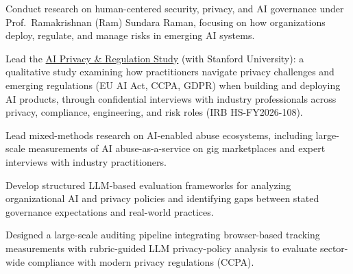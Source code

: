 \documentclass[letterpaper,10pt]{article}
\begin{document}
\begin{bullets}
  \item Conduct research on human-centered security, privacy, and AI governance under Prof.\ Ramakrishnan (Ram) Sundara Raman, focusing on how organizations deploy, regulate, and manage risks in emerging AI systems.
  \item Lead the \href{https://randlab.engineering.ucsc.edu/aigov-study/}{AI Privacy \& Regulation Study} (with Stanford University): a qualitative study examining how practitioners navigate privacy challenges and emerging regulations (EU AI Act, CCPA, GDPR) when building and deploying AI products, through confidential interviews with industry professionals across privacy, compliance, engineering, and risk roles (IRB HS-FY2026-108).
  \item Lead mixed-methods research on AI-enabled abuse ecosystems, including large-scale measurements of AI abuse-as-a-service on gig marketplaces and expert interviews with industry practitioners.
  \item Develop structured LLM-based evaluation frameworks for analyzing organizational AI and privacy policies and identifying gaps between stated governance expectations and real-world practices.
  \item Designed a large-scale auditing pipeline integrating browser-based tracking measurements with rubric-guided LLM privacy-policy analysis to evaluate sector-wide compliance with modern privacy regulations (CCPA).
\end{bullets}
\end{document}
